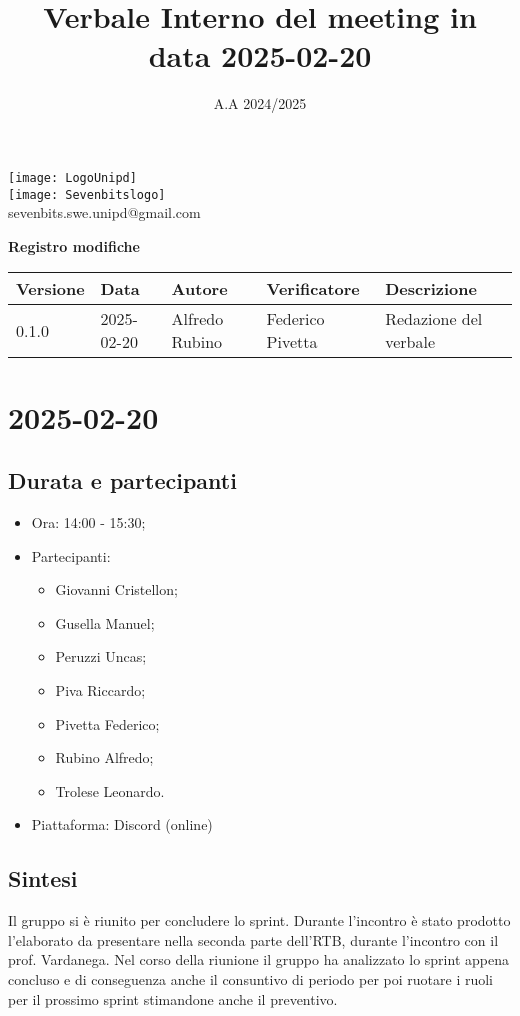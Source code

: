 \documentclass[10pt]{article}
\title{Verbale Interno del meeting in data 2025-02-20}
\date{A.A 2024/2025}
\begin{document}
\maketitle
\begin{center}
\texttt{[image: LogoUnipd]}\\
\texttt{[image: Sevenbitslogo]}\\
sevenbits.swe.unipd@gmail.com\\
\vspace{2mm}

\textbf{Registro modifiche}\\
\vspace{2mm}
\begin{tabularx}{\textwidth}{|l|l|l|l|X|}
\hline
\textbf{Versione} & \textbf{Data} & \textbf{Autore} & \textbf{Verificatore} & \textbf{Descrizione} \\
\hline
0.1.0 & 2025-02-20 & Alfredo Rubino & Federico Pivetta & Redazione del verbale \\
\hline
\end{tabularx}
\end{center}

\newpage
\tableofcontents
\newpage
\section{2025-02-20}
\subsection{Durata e partecipanti}
\begin{itemize}
\item Ora: 14:00 - 15:30;
\item Partecipanti:
	\begin{itemize}
    	\item Giovanni Cristellon;
		\item Gusella Manuel;
		\item Peruzzi Uncas;
		\item Piva Riccardo;
		\item Pivetta Federico;
		\item Rubino Alfredo;
		\item Trolese Leonardo.
	\end{itemize}
\item Piattaforma: Discord (online)
\end{itemize}

\subsection{Sintesi}
Il gruppo si è riunito per concludere lo sprint. Durante l'incontro è stato prodotto l'elaborato da presentare nella seconda parte dell'RTB, durante l'incontro con il prof. Vardanega.
Nel corso della riunione il gruppo ha analizzato lo sprint appena concluso e di conseguenza anche il consuntivo di periodo per poi ruotare i ruoli per il prossimo sprint stimandone anche il preventivo.
\end{document}
